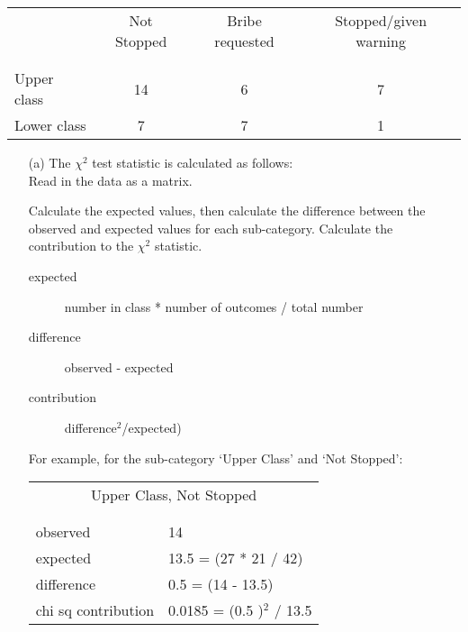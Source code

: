 \documentclass[12pt,letterpaper]{article}
\begin{document}
\begin{table}[htb!]
	\centering
	\begin{tabular}{l | c c c }
		& Not Stopped & Bribe requested & Stopped/given warning \\
		\\[-1.8ex] 
		\hline \\[-1.8ex]
		Upper class & 14 & 6 & 7 \\
		Lower class & 7 & 7 & 1 \\
		\hline
	\end{tabular}
\end{table}

\begin{enumerate}

	\item [(a)]
	The $\chi^2$ test statistic is calculated as follows:\\
	
	Read in the data as a matrix.
	  

	Calculate the expected values, then calculate the difference between the observed 
	and expected values for each sub-category.  Calculate the contribution to the 
	$\chi^2$ statistic. 
	\begin{description}
	  \item[expected] number in class * number of outcomes / total number
	  \item[difference] observed - expected
	  \item[contribution] difference$^2$/expected) 
	 \end{description}
		
		For example, for the sub-category `Upper Class' and `Not Stopped':
	
	\begin{table}[htb]
		\centering
		\begin{tabular}{l | l}
			\multicolumn{2}{c}{Upper Class, Not Stopped} \\
			\\[-1.8ex] 
			\hline \\[-1.8ex]
			observed  &  14  \\
			expected  &  13.5 = (27 * 21 / 42)\\
			difference  &  0.5  = (14 - 13.5)\\
			chi sq contribution  &  0.0185  = (0.5 )$^2$ / 13.5\\
			
		\end{tabular}
	\end{table}
	

\end{enumerate}
\end{document}
